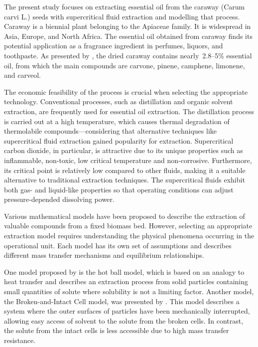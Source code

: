 \documentclass[../Article_Model_Parameters.tex]{subfiles}
\begin{document}
	
	The present study focuses on extracting essential oil from the caraway (Carum carvi L.) seeds with supercritical fluid extraction and modelling that process. Caraway is a biennial plant belonging to the Apiaceae family. It is widespread in Asia, Europe, and North Africa. The essential oil obtained from caraway finds its potential application as a fragrance ingredient in perfumes, liquors, and toothpaste. As presented by \citet{Hromis2015}, the dried caraway contains nearly~2.8–5\% essential oil, from which the main compounds are carvone, pinene, camphene, limonene, and carveol. 
	
	The economic feasibility of the process is crucial when selecting the appropriate technology. Conventional processes, such as distillation and organic solvent extraction, are frequently used for essential oil extraction. The distillation process is carried out at a high temperature, which causes thermal degradation of thermolabile compounds—considering that alternative techniques like supercritical fluid extraction gained popularity for extraction. Supercritical carbon dioxide, in particular, is attractive due to its unique properties such as inflammable, non-toxic, low critical temperature and non-corrosive. Furthermore, its critical point is relatively low compared to other fluids, making it a suitable alternative to traditional extraction techniques. The supercritical fluids exhibit both gas- and liquid-like properties so that operating conditions can adjust pressure-depended dissolving power.
	
	Various mathematical models have been proposed to describe the extraction of valuable compounds from a fixed biomass bed. However, selecting an appropriate extraction model requires understanding the physical phenomena occurring in the operational unit. Each model has its own set of assumptions and describes different mass transfer mechanisms and equilibrium relationships.
	
	One model proposed by \citet{Reverchon1993} is the hot ball model, which is based on an analogy to heat transfer and describes an extraction process from solid particles containing small quantities of solute where solubility is not a limiting factor. Another model, the Broken-and-Intact Cell model, was presented by \citet{Sovova1994}. This model describes a system where the outer surfaces of particles have been mechanically interrupted, allowing easy access of solvent to the solute from the broken cells. In contrast, the solute from the intact cells is less accessible due to high mass transfer resistance.
	
\end{document}
